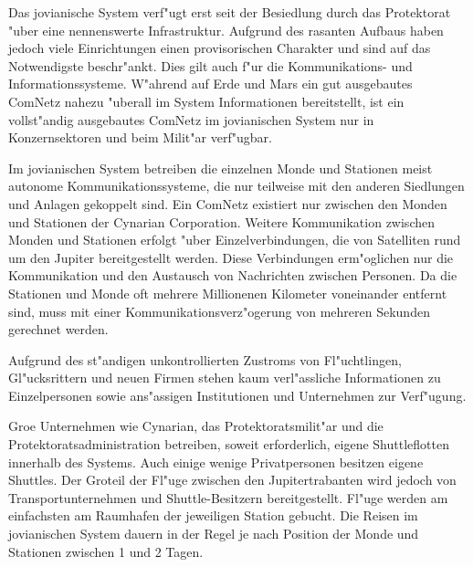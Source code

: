 
Das jovianische System verf"ugt erst seit der Besiedlung durch das Protektorat "uber eine nennenswerte Infrastruktur. Aufgrund des rasanten Aufbaus haben jedoch viele Einrichtungen einen provisorischen Charakter und sind auf das Notwendigste beschr"ankt. Dies gilt auch f"ur die Kommunikations- und Informationssysteme. W"ahrend auf Erde und Mars ein gut ausgebautes ComNetz nahezu "uberall im System Informationen bereitstellt, ist ein vollst"andig ausgebautes ComNetz im jovianischen System nur in Konzernsektoren und beim Milit"ar verf"ugbar.

Im jovianischen System betreiben die einzelnen Monde und Stationen meist autonome Kommunikationssysteme, die nur teilweise mit den anderen Siedlungen und Anlagen gekoppelt sind. Ein ComNetz existiert nur zwischen den Monden und Stationen der Cynarian Corporation. Weitere Kommunikation zwischen Monden und Stationen erfolgt "uber Einzelverbindungen, die von Satelliten rund um den Jupiter bereitgestellt werden. Diese Verbindungen erm"oglichen nur die Kommunikation und den Austausch von Nachrichten zwischen Personen. Da die Stationen und Monde oft mehrere Millionenen Kilometer voneinander entfernt sind, muss mit einer Kommunikationsverz"ogerung von mehreren Sekunden gerechnet werden.

Aufgrund des st"andigen unkontrollierten Zustroms von Fl"uchtlingen, Gl"ucksrittern und neuen Firmen stehen kaum verl"assliche Informationen zu Einzelpersonen sowie ans"assigen Institutionen und Unternehmen zur Verf"ugung.


Gro\3e Unternehmen wie Cynarian, das Protektoratsmilit"ar und die Protektoratsadministration betreiben, soweit erforderlich, eigene Shuttleflotten innerhalb des Systems. Auch einige wenige Privatpersonen besitzen eigene Shuttles. Der Gro\3teil der Fl"uge zwischen den Jupitertrabanten wird jedoch von Transportunternehmen und Shuttle-Besitzern bereitgestellt. Fl"uge werden am einfachsten am Raumhafen der jeweiligen Station gebucht. Die Reisen im jovianischen System dauern in der Regel je nach Position der Monde und Stationen zwischen 1 und 2 Tagen.